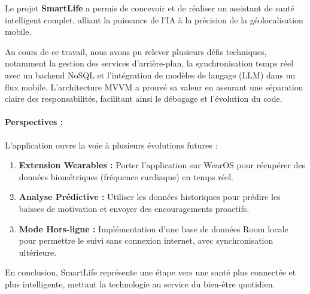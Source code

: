 \documentclass[12pt,a4paper,oneside]{report}
\begin{document}
Le projet \textbf{SmartLife} a permis de concevoir et de réaliser un assistant de santé intelligent complet, alliant la puissance de l'IA à la précision de la géolocalisation mobile.

Au cours de ce travail, nous avons pu relever plusieurs défis techniques, notamment la gestion des services d'arrière-plan, la synchronisation temps réel avec un backend NoSQL et l'intégration de modèles de langage (LLM) dans un flux mobile. L'architecture MVVM a prouvé sa valeur en assurant une séparation claire des responsabilités, facilitant ainsi le débogage et l'évolution du code.

\paragraph{Perspectives :}
L'application ouvre la voie à plusieurs évolutions futures :
\begin{enumerate}
    \item \textbf{Extension Wearables :} Porter l'application sur WearOS pour récupérer des données biométriques (fréquence cardiaque) en temps réel.
    \item \textbf{Analyse Prédictive :} Utiliser les données historiques pour prédire les baisses de motivation et envoyer des encouragements proactifs.
    \item \textbf{Mode Hors-ligne :} Implémentation d'une base de données Room locale pour permettre le suivi sans connexion internet, avec synchronisation ultérieure.
\end{enumerate}

En conclusion, SmartLife représente une étape vers une santé plus connectée et plus intelligente, mettant la technologie au service du bien-être quotidien.
\end{document}

